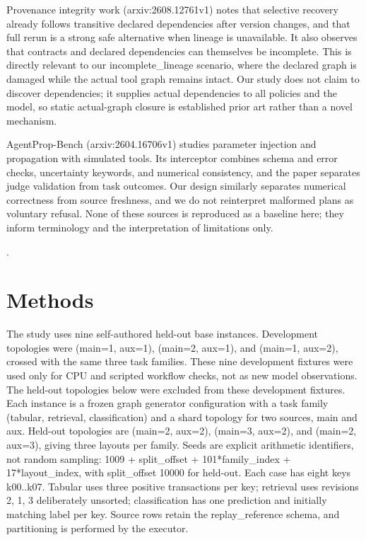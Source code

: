 \documentclass{article}
\begin{document}
Provenance integrity work (arxiv:2608.12761v1) notes that selective recovery already follows transitive declared dependencies after version changes, and that full rerun is a strong safe alternative when lineage is unavailable. It also observes that contracts and declared dependencies can themselves be incomplete. This is directly relevant to our incomplete\_lineage scenario, where the declared graph is damaged while the actual tool graph remains intact. Our study does not claim to discover dependencies; it supplies actual dependencies to all policies and the model, so static actual-graph closure is established prior art rather than a novel mechanism.

AgentProp-Bench (arxiv:2604.16706v1) studies parameter injection and propagation with simulated tools. Its interceptor combines schema and error checks, uncertainty keywords, and numerical consistency, and the paper separates judge validation from task outcomes. Our design similarly separates numerical correctness from source freshness, and we do not reinterpret malformed plans as voluntary refusal. None of these sources is reproduced as a baseline here; they inform terminology and the interpretation of limitations only.

\citep{ref0001,ref0002,ref0003}.

\section{Methods}

The study uses nine self-authored held-out base instances. Development topologies were (main=1, aux=1), (main=2, aux=1), and (main=1, aux=2), crossed with the same three task families. These nine development fixtures were used only for CPU and scripted workflow checks, not as new model observations. The held-out topologies below were excluded from these development fixtures. Each instance is a frozen graph generator configuration with a task family (tabular, retrieval, classification) and a shard topology for two sources, main and aux. Held-out topologies are (main=2, aux=2), (main=3, aux=2), and (main=2, aux=3), giving three layouts per family. Seeds are explicit arithmetic identifiers, not random sampling: 1009 + split\_offset + 101*family\_index + 17*layout\_index, with split\_offset 10000 for held-out. Each case has eight keys k00..k07. Tabular uses three positive transactions per key; retrieval uses revisions 2, 1, 3 deliberately unsorted; classification has one prediction and initially matching label per key. Source rows retain the replay\_reference schema, and partitioning is performed by the executor.
\end{document}
